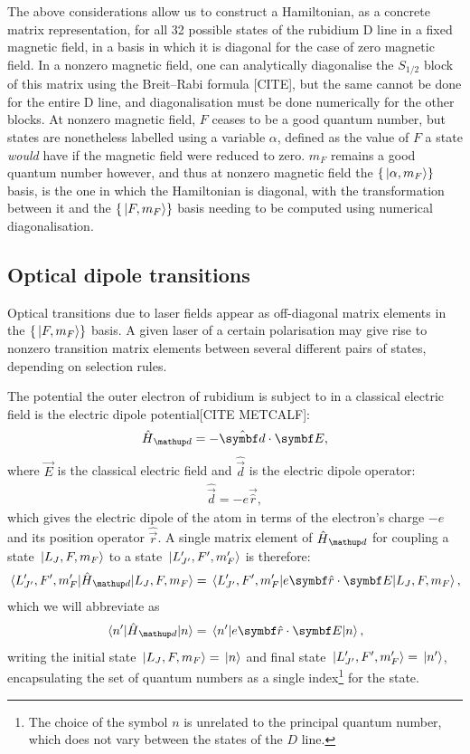 The above considerations allow us to construct a Hamiltonian, as a concrete matrix representation, for all 32 possible states of the rubidium D line in a fixed magnetic field, in a basis in which it is diagonal for the case of zero magnetic field. In a nonzero magnetic field, one can analytically diagonalise the $S_{1/2}$ block of this matrix using the Breit--Rabi formula [CITE], but the same cannot be done for the entire D line, and diagonalisation must be done numerically for the other blocks. At nonzero magnetic field, $F$ ceases to be a good quantum number, but states are nonetheless labelled using a variable $\alpha$, defined as the value of $F$ a state \emph{would} have if the magnetic field were reduced to zero. $m_F$ remains a good quantum number however, and thus at nonzero magnetic field the $\{\ket{\alpha, m_F}\}$ basis, is the one in which the Hamiltonian is diagonal, with the transformation between it and the $\{\ket{F, m_F}\}$ basis needing to be computed using numerical diagonalisation.

\subsection{Optical dipole transitions}\label{sec:optical_dipole_transitions}

Optical transitions due to laser fields appear as off-diagonal matrix elements in the $\{\ket{F, m_F}\}$ basis. A given laser of a certain polarisation may give rise to nonzero transition matrix elements between several different pairs of states, depending on selection rules.

The potential the outer electron of rubidium is subject to in a classical electric field is the electric dipole potential[CITE METCALF]:
\begin{align}
\hat H_\up{d} = -\hat{\vec d}\cdot\vec E,
\end{align}
where $\vec E$ is the classical electric field and $\hat{\vec d}$ is the electric dipole operator:
\begin{align}
\hat{\vec d} = -e\vec{\hat r},
\end{align}
which gives the electric dipole of the atom in terms of the electron's charge $-e$ and its position operator $\hat{\vec r}$. A single matrix element of $\hat H_\up{d}$ for coupling a state $\ket{L_J, F, m_F}$ to a state $\ket{L^\prime_{J^\prime}, F^\prime, m_F^\prime}$ is therefore:
\begin{align}\label{eq:electric_dipole_potential}
\matrixel{L^\prime_{J^\prime}, F^\prime, m_F^\prime}{\hat H_\up{d}}{L_J, F, m_F} = 
\matrixel{L^\prime_{J^\prime}, F^\prime, m_F^\prime}{e\vec{\hat r}\cdot\vec E}{L_J, F, m_F},
\end{align}
which we will abbreviate as
\begin{align}
\matrixel{n^\prime}{\hat H_\up{d}}{n} = 
\matrixel{n^\prime}{e\vec{\hat r}\cdot\vec E}{n},
\end{align}
writing the initial state $\ket{L_J, F, m_F}=\ket{n}$ and final state $\ket{L^\prime_{J^\prime}, F^\prime, m_F^\prime}=\ket{n^\prime}$, encapsulating the set of quantum numbers as a single index\footnote{The choice of the symbol $n$ is unrelated to the principal quantum number, which does not vary between the states of the $D$ line.} for the state.

